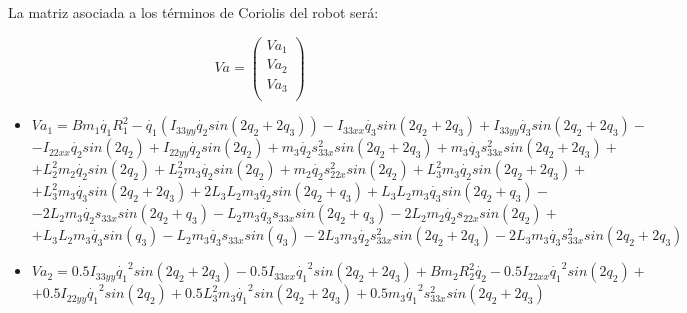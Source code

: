 


La matriz asociada a los términos de Coriolis del robot será:

\[
Va=
\begin{pmatrix}
Va_{1}\\
Va_{2}\\
Va_{3}\\
\end{pmatrix} \]

\begin{itemize}

	\item $Va_{1}=Bm_{1}\dot{q_{1}}R_{1}^{2} -\dot{q_{1}}(I_{33yy}\dot{q_{2}} sin(2q_{2}+2q_{3})) -I_{33xx}\dot{q_{3}} sin(2q_{2}+2q_{3}) +I_{33yy}\dot{q_{3}}sin(2q_{2}+2q_{3})- $ \\ \vspace{0.1cm}
	$ -I_{22xx}\dot{q_{2}} sin(2q_{2}) +I_{22yy}\dot{q_{2}} sin(2q_{2}) +  m_{3}\dot{q_{2}}s_{33x}^{2}sin(2q_{2}+2q_{3}) + m_{3}\dot{q_{3}}s_{33x}^{2}sin(2q_{2}+2q_{3}) +$ \\ \vspace{0.1cm}
	$  +L_{2}^{2}m_2 \dot{q_{2}}sin(2q_{2}) + L_{2}^{2}m_{3}\dot{q_{2}}sin( 2q_{2}) +  m_{2}\dot{q_{2}}s_{22x}^{2}sin(2q_{2}) +L_{3}^{2}m_{3} \dot{q_{2}}sin(2q_{2}+2q_{3}) +$ \\ \vspace{0.1cm}
	$ + L_{3}^{2}m_{3} \dot{q_{3}}sin(2q_{2}+2q_{3}) +  2L_{3}L_{2}m_{3} \dot{q_{2}}sin(2q_{2}+q_{3}) +L_{3}L_{2}m_{3} \dot{q_{3}}sin(2q_{2}+q_{3}) - $ \\ \vspace{0.1cm}
	$ -2L_{2}m_{3}\dot{q_{2}}s_{33x}sin(2q_{2}+q_{3})- L_{2}m_{3}\dot{q_{3}}s_{33x}sin(2q_{2}+q_{3}) -2L_{2}m_{2}\dot{q_{2}}s_{22x}sin(2q_{2}) +$ \\ \vspace{0.1cm}
	$ +L_{3}L_{2}m_{3} \dot{q_{3}}sin(q_{3}) -L_{2}m_{3} \dot{q_{3}}s_{33x}sin(q_{3}) -2L_{3}m_{3}\dot{q_{2}}s_{33x}^{2}sin(2q_{2}+2q_{3}) - 2L_{3}m_{3}\dot{q_{3}}s_{33x}^{2}sin(2q_{2}+2q_{3})  $ \\ \vspace{0.2cm}
	\item $Va_{2}=0.5I_{33yy}\dot{q_{1}}^{2}sin(2q_{2}+2q_{3}) -0.5I_{33xx}\dot{q_{1}}^{2}sin(2q_{2}+2q_{3}) +Bm_{2}R_{2}^{2}\dot{q_{2}} -0.5I_{22xx}\dot{q_{1}}^{2}sin(2q_{2})+ $ \\ \vspace{0.1cm}
	$+0.5I_{22yy}\dot{q_{1}}^{2}sin(2q_{2}) +0.5L_{3}^{2}m_{3} \dot{q_{1}}^{2}sin(2q_{2}+2q_{3}) +0.5m_{3}\dot{q_{1}}^{2}s_{33x}^{2}sin(2q_{2}+2q_{3}) $ \\ \vspace{0.1cm}

\end{itemize}
